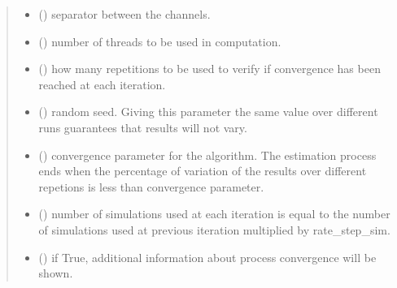 \documentclass[letterpaper,10pt,english]{sphinxmanual}
\begin{document}
\begin{fulllineitems}
\begin{quote}
\begin{description}
\begin{itemize}
\item {} 
\sphinxAtStartPar
{} (\sphinxstyleliteralemphasis{\sphinxupquote{, }}) \textendash{} separator between the channels.

\item {} 
\sphinxAtStartPar
{} (\sphinxstyleliteralemphasis{\sphinxupquote{, }}) \textendash{} number of threads to be used in computation.

\item {} 
\sphinxAtStartPar
{} (\sphinxstyleliteralemphasis{\sphinxupquote{, }}) \textendash{} how many repetitions to be used to verify if convergence has been reached at each iteration.

\item {} 
\sphinxAtStartPar
{} (\sphinxstyleliteralemphasis{\sphinxupquote{, }}) \textendash{} random seed. Giving this parameter the same value over different runs guarantees that results will not vary.

\item {} 
\sphinxAtStartPar
{} (\sphinxstyleliteralemphasis{\sphinxupquote{, }}) \textendash{} convergence parameter for the algorithm. The estimation process ends when the percentage of variation of the results over different repetions is less than convergence parameter.

\item {} 
\sphinxAtStartPar
{} (\sphinxstyleliteralemphasis{\sphinxupquote{, }}) \textendash{} number of simulations used at each iteration is equal to the number of simulations used at previous iteration multiplied by rate\_step\_sim.

\item {} 
\sphinxAtStartPar
{} (\sphinxstyleliteralemphasis{\sphinxupquote{, }}) \textendash{} if True, additional information about process convergence will be shown.


\end{itemize}
\end{description}
\end{quote}
\end{fulllineitems}
\end{document}
